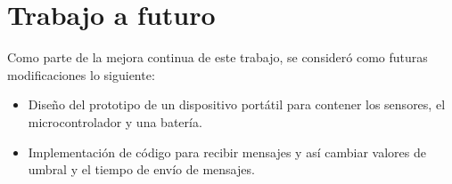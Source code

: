 
\section{Trabajo a futuro}

Como parte de la mejora continua de este trabajo, se consideró como futuras modificaciones lo siguiente:

\begin{itemize}
	\item Diseño del prototipo de un dispositivo portátil para contener los sensores, el microcontrolador y una batería.
	\item Implementación de código para recibir mensajes y así cambiar valores de umbral y el tiempo de envío de mensajes.
\end{itemize}